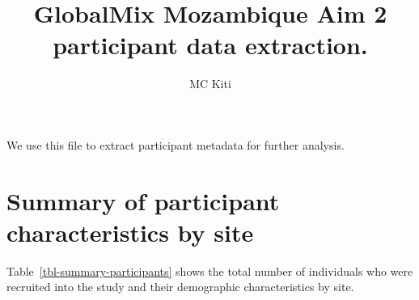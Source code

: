 \documentclass[
  letterpaper,
  DIV=11,
  numbers=noendperiod]{scrartcl}
\title{GlobalMix Mozambique Aim 2 participant data extraction.}
\author{MC Kiti}
\date{}
\begin{document}
\maketitle
\ifdefined\Shaded\renewenvironment{Shaded}{\begin{tcolorbox}[boxrule=0pt, borderline west={3pt}{0pt}{shadecolor}, interior hidden, enhanced, breakable, sharp corners, frame hidden]}{\end{tcolorbox}}\fi

We use this file to extract participant metadata for further analysis.

\hypertarget{summary-of-participant-characteristics-by-site}{%
\section{Summary of participant characteristics by
site}\label{summary-of-participant-characteristics-by-site}}

Table~\ref{tbl-summary-participants} shows the total number of
individuals who were recruited into the study and their demographic
characteristics by site.
\end{document}
